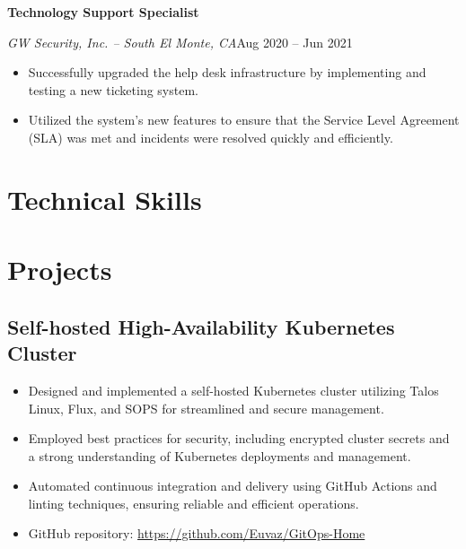 \documentclass[a4paper]{article}
\begin{document}
\vspace{0.5em}
\textbf{Technology Support Specialist}\par
\textit{GW Security, Inc. -- South El Monte, CA}\hfill Aug 2020 -- Jun 2021

\begin{itemize}[noitemsep,nolistsep]
    \item Successfully upgraded the help desk infrastructure by implementing and testing a new ticketing system.
    \item Utilized the system's new features to ensure that the Service Level Agreement (SLA) was met and incidents were resolved quickly and efficiently.
\end{itemize}

\section{Technical Skills}
\begin{minipage}{\textwidth}
\begin{itemize}
    \apptechnicalskills{}
\end{itemize}
\end{minipage}

\section{Projects}
\subsection{Self-hosted High-Availability Kubernetes Cluster}
\begin{itemize}[noitemsep,nolistsep]
    \item Designed and implemented a self-hosted Kubernetes cluster utilizing Talos Linux, Flux, and SOPS for streamlined and secure management.
    \item Employed best practices for security, including encrypted cluster secrets and a strong understanding of Kubernetes deployments and management.
    \item Automated continuous integration and delivery using GitHub Actions and linting techniques, ensuring reliable and efficient operations.
    \item GitHub repository: \url{https://github.com/Euvaz/GitOps-Home}
\end{itemize}
\end{document}
